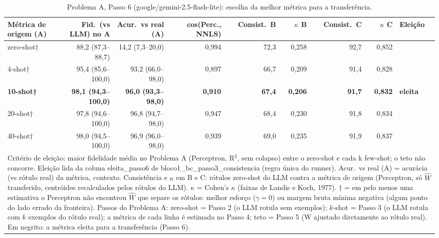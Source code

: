 \begin{table}[htbp]
\centering
\small
\caption{Problema A, Passo 6 (google/gemini-2.5-flash-lite): escolha da melhor métrica para a transferência.}
\label{tab:A_passo6_eleicao_flashlite}
\begin{tabular}{lrrrrrrrl}
\toprule
Métrica de origem (A) & Fid.\ (vs LLM) no A & Acur.\ vs real (A) & cos(Perc., NNLS) & Consist.\ B & $\kappa$ B & Consist.\ C & $\kappa$ C & Eleição \\
\midrule
zero-shot† & 88,2 (87,3–88,7) & 14,2 (7,3–20,0) & 0,994 & 72,3 & 0,258 & 92,7 & 0,852 &  \\
4-shot† & 95,4 (85,6–100,0) & 93,2 (66,0–98,0) & 0,897 & 66,7 & 0,209 & 91,4 & 0,828 &  \\
\textbf{10-shot†} & \textbf{98,1 (94,3–100,0)} & \textbf{96,0 (93,3–98,0)} & \textbf{0,910} & \textbf{67,4} & \textbf{0,206} & \textbf{91,7} & \textbf{0,832} & \textbf{eleita} \\
20-shot† & 97,8 (94,6–100,0) & 96,8 (94,7–98,0) & 0,947 & 68,4 & 0,230 & 91,8 & 0,834 &  \\
40-shot† & 98,0 (94,5–100,0) & 96,9 (96,0–98,0) & 0,939 & 69,0 & 0,235 & 91,9 & 0,837 &  \\
\bottomrule
\multicolumn{9}{p{0.95\linewidth}}{\footnotesize Critério de eleição: maior fidelidade média no Problema A (Perceptron, R$^2$, sem colapso) entre o zero-shot e cada k few-shot; o teto não concorre. Eleição lida da coluna eleita\_passo6 de bloco1\_bc\_passo3\_consistencia (regra única do runner). Acur.\ vs real (A) = acurácia (vs rótulo real) da métrica, contexto. Consistência e $\kappa$ em B e C: rótulos zero-shot do LLM contra a métrica de origem (Perceptron, só $\hat{W}$ transferido, centróides recalculados pelos rótulos do LLM). $\kappa$ = Cohen's $\kappa$ (faixas de Landis e Koch, 1977). † = em pelo menos uma estimativa o Perceptron não encontrou $\hat{W}$ que separe os rótulos: melhor esforço ($\gamma = 0$) ou margem bruta mínima negativa (algum ponto do lado errado da fronteira). Passos do Problema A: zero-shot = Passo 2 (o LLM rotula sem exemplos); $k$-shot = Passo 3 (o LLM rotula com $k$ exemplos do rótulo real); a métrica de cada linha é estimada no Passo 4; teto = Passo 5 (W ajustado diretamente ao rótulo real). Em negrito: a métrica eleita para a transferência (Passo 6).} \\
\end{tabular}
\end{table}
